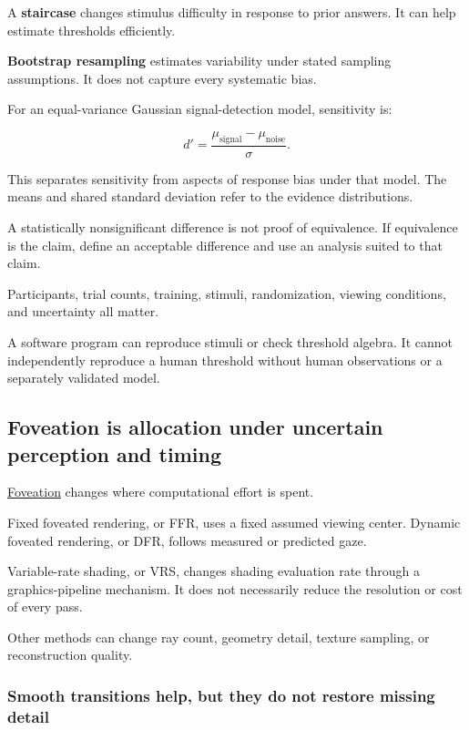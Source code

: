 A \textbf{staircase} changes stimulus difficulty in response to prior answers. It can help estimate thresholds efficiently.

\textbf{Bootstrap resampling} estimates variability under stated sampling assumptions. It does not capture every systematic bias.

For an equal-variance Gaussian signal-detection model, sensitivity is:

\[
d'=\frac{\mu_{\mathrm{signal}}-\mu_{\mathrm{noise}}}{\sigma}.
\]

This separates sensitivity from aspects of response bias under that model. The means and shared standard deviation refer to the evidence distributions.

A statistically nonsignificant difference is not proof of equivalence. If equivalence is the claim, define an acceptable difference and use an analysis suited to that claim.

Participants, trial counts, training, stimuli, randomization, viewing conditions, and uncertainty all matter.

A software program can reproduce stimuli or check threshold algebra. It cannot independently reproduce a human threshold without human observations or a separately validated model.

\subsection{Foveation is allocation under uncertain perception and timing}\label{04-visual-computing-ii-ch043-foveation-is-allocation-under-uncertain-perception-and-timing}

\hyperref[appendix-5878b813b732]{Foveation} changes where computational effort is spent.

Fixed foveated rendering, or FFR, uses a fixed assumed viewing center. Dynamic foveated rendering, or DFR, follows measured or predicted gaze.

Variable-rate shading, or VRS, changes shading evaluation rate through a graphics-pipeline mechanism. It does not necessarily reduce the resolution or cost of every pass.

Other methods can change ray count, geometry detail, texture sampling, or reconstruction quality.

\subsubsection{Smooth transitions help, but they do not restore missing detail}\label{04-visual-computing-ii-ch043-smooth-transitions-help-but-they-do-not-restore-missing-detail}


